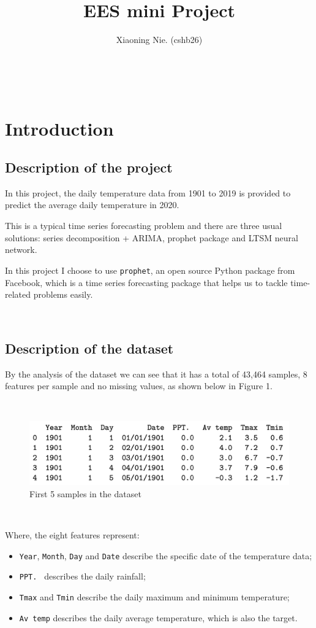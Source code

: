 \documentclass{article}
\title{EES mini Project}
\author{Xiaoning Nie. (cshb26)}
\begin{document}
\maketitle

\


\section{Introduction}

\subsection{Description of the project}

In this project, the daily temperature data from 1901 to 2019 is provided to predict the average daily temperature in 2020.

This is a typical time series forecasting problem and there are three usual solutions: series decomposition + ARIMA, prophet package and LTSM neural network.

In this project I choose to use \verb|prophet|, an open source Python package from Facebook, which is a time series forecasting package that helps us to tackle time-related problems easily.

\

\subsection{Description of the dataset}

By the analysis of the dataset we can see that it has a total of 43,464 samples, 8 features per sample and no missing values, as shown below in Figure 1.

\

\begin{figure}[hp]
\centering
\includegraphics[width=12cm]{datadesc.png} %
\caption{First 5 samples in the dataset} %
\end{figure}

\

Where, the eight features represent:

\begin{itemize}
\item \verb|Year|, \verb|Month|, \verb|Day| and \verb|Date| describe the specific date of the temperature data;
\item \verb|PPT. | describes the daily rainfall;
\item \verb|Tmax| and \verb|Tmin| describe the daily maximum and minimum temperature;
\item \verb|Av temp| describes the daily average temperature, which is also the target.
\end{itemize}
\end{document}
